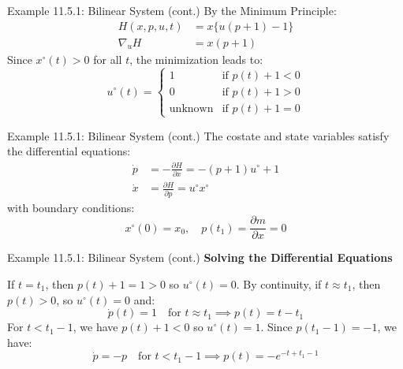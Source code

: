 \documentclass[10pt]{beamer}
\begin{document}
\begin{frame}[fragile]{Example 11.5.1: Bilinear System (cont.)}
  By the Minimum Principle:
  \[
    \begin{aligned}
      H(x, p, u, t) &= x \{ u(p + 1) - 1 \} \\
      \nabla_u H &= x(p + 1)
    \end{aligned}
  \]
  Since \( x^{\circ}(t) > 0 \) for all $t$, the minimization leads to:
  \[
  u^\circ(t) = \begin{cases}
  1 & \text{if } p(t) + 1 < 0 \\
  0 & \text{if } p(t) + 1 > 0 \\
  \text{unknown} & \text{if } p(t)+1 = 0
  \end{cases}
  \]
\end{frame}
  
\begin{frame}[fragile]{Example 11.5.1: Bilinear System (cont.)}
  The costate and state variables satisfy the differential equations:
  \[
  \begin{aligned}
    \dot{p} &= - \frac{\partial H}{\partial x} = -(p+1)u^{\circ}+1 \\
    \dot{x} &= \frac{\partial H}{\partial p} = u^{\circ}x^{\circ}
  \end{aligned}
  \]
  with boundary conditions:
  \[
    x^{\circ}(0)=x_0, \quad p(t_1)=\frac{\partial m}{\partial x} = 0
  \]
\end{frame}
  
\begin{frame}[fragile]{Example 11.5.1: Bilinear System (cont.)}
  \textbf{Solving the Differential Equations}
  
  If \( t = t_1 \), then \( p(t) + 1 = 1 > 0 \) so \( u^\circ(t) = 0 \). By continuity, if \( t \approx t_1 \), then \( p(t) > 0 \), so \( u^\circ(t) = 0 \) and:
  \[
  \dot{p}(t) = 1 \quad \text{for } t \approx t_1 \implies p(t) = t - t_1
  \]
  For \( t < t_1 - 1 \), we have \( p(t) + 1 < 0 \) so \( u^\circ(t) = 1 \). Since $p(t_1-1)=-1$, we have:
  \[
  \dot{p} = -p \quad \text{for } t < t_1 - 1 \implies p(t) = -e^{-t + t_1 - 1}
  \]
\end{frame}
\end{document}

